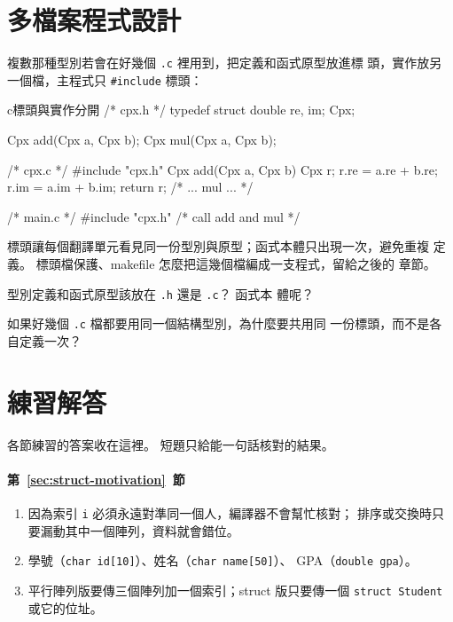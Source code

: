 \section{多檔案程式設計}
\label{sec:struct-multifile}

複數那種型別若會在好幾個 \texttt{.c} 裡用到，把定義和函式原型放進標
頭，實作放另一個檔，主程式只 \texttt{\#include} 標頭：

\begin{code}{c}{標頭與實作分開}
/* cpx.h */
typedef struct {
    double re, im;
} Cpx;

Cpx add(Cpx a, Cpx b);
Cpx mul(Cpx a, Cpx b);

/* cpx.c */
#include "cpx.h"
Cpx add(Cpx a, Cpx b) {
    Cpx r;
    r.re = a.re + b.re;
    r.im = a.im + b.im;
    return r;
}
/* ... mul ... */

/* main.c */
#include "cpx.h"
/* call add and mul */
\end{code}

標頭讓每個翻譯單元看見同一份型別與原型；函式本體只出現一次，避免重複
定義。 標頭檔保護、makefile 怎麼把這幾個檔編成一支程式，留給之後的
章節。


\begin{drills}[label=drills:struct-multifile]
\item 型別定義和函式原型該放在 \texttt{.h} 還是 \texttt{.c}？ 函式本
體呢？
\item 如果好幾個 \texttt{.c} 檔都要用同一個結構型別，為什麼要共用同
一份標頭，而不是各自定義一次？
\end{drills}

\section*{練習解答}

各節練習的答案收在這裡。 短題只給能一句話核對的結果。

\paragraph{第~\ref{sec:struct-motivation}~節}
\begin{enumerate}
\item 因為索引 \texttt{i} 必須永遠對準同一個人，編譯器不會幫忙核對；
排序或交換時只要漏動其中一個陣列，資料就會錯位。
\item 學號（\texttt{char id[10]}）、姓名（\texttt{char name[50]}）、
GPA（\texttt{double gpa}）。
\item 平行陣列版要傳三個陣列加一個索引；struct 版只要傳一個
\texttt{struct Student} 或它的位址。
\end{enumerate}

